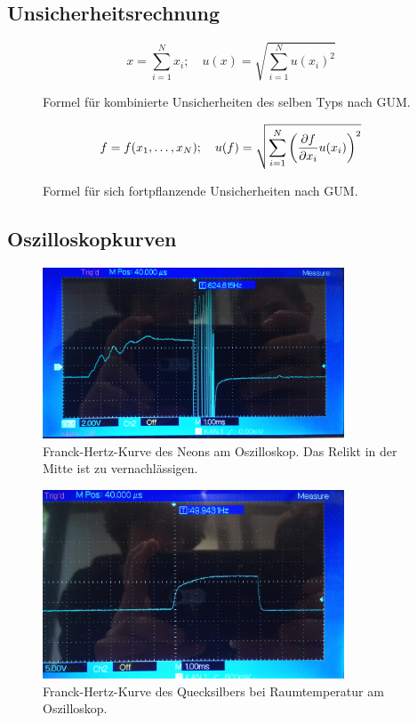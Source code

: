 \subsection{Unsicherheitsrechnung}\label{VGuD}

\begin{figure}[h]
	\begin{equation*}
		x = \sum_{i=1}^{N} x_i
		;\quad
		u(x) = \sqrt{\sum_{i = 1}^{N} u(x_i)^2}
	\end{equation*}
	\caption{Formel für kombinierte Unsicherheiten des selben Typs nach GUM.}
	\label{eq:GUM_combine}
\end{figure}

\begin{figure}[h]
	\begin{align*}
		f = f(x_1, \dots , x_N)
		;\quad
		u(f) = \sqrt{\sum_{i = 1}^{N}\left(\pdv{f}{x_i} u(x_i)\right) ^2}
	\end{align*}
	\caption{Formel für sich fortpflanzende Unsicherheiten nach GUM.}
	\label{eq:GUM_formula}
\end{figure}

\subsection{Oszilloskopkurven}

\begin{figure}[ht]
	\centering
	\includegraphics[width=0.8\textwidth]{bilder/ne.jpg}
	\caption{Franck-Hertz-Kurve des Neons am Oszilloskop. Das Relikt in der Mitte ist zu vernachlässigen.}
	\label{fig:kurveNe}	
\end{figure}

\begin{figure}[ht]
	\centering
	\includegraphics[width=0.8\textwidth]{bilder/hgl.jpg}
	\caption{Franck-Hertz-Kurve des Quecksilbers bei Raumtemperatur am Oszilloskop.}
	\label{fig:kurveHgl}	
\end{figure}

